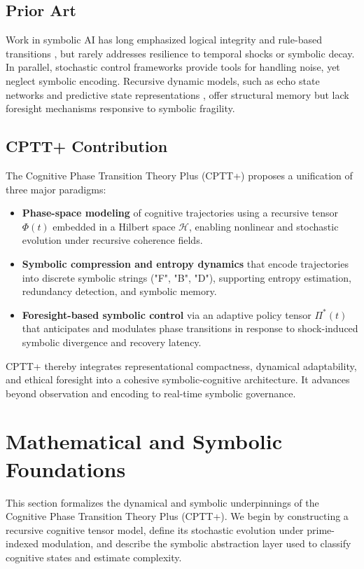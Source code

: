 \documentclass[12pt]{article}
\begin{document}
\subsection*{Prior Art}

Work in symbolic AI has long emphasized logical integrity and rule-based transitions \cite{d2020symbolic}, but rarely addresses resilience to temporal shocks or symbolic decay. In parallel, stochastic control frameworks \cite{gardiner2009stochastic} provide tools for handling noise, yet neglect symbolic encoding. Recursive dynamic models, such as echo state networks and predictive state representations \cite{jaeger2001echo}, offer structural memory but lack foresight mechanisms responsive to symbolic fragility.

\subsection*{CPTT+ Contribution}

The Cognitive Phase Transition Theory Plus (CPTT+) proposes a unification of three major paradigms:

\begin{itemize}
  \item \textbf{Phase-space modeling} of cognitive trajectories using a recursive tensor $\Phi(t)$ embedded in a Hilbert space $\mathcal{H}$, enabling nonlinear and stochastic evolution under recursive coherence fields.
  \item \textbf{Symbolic compression and entropy dynamics} that encode trajectories into discrete symbolic strings ("F", "B", "D"), supporting entropy estimation, redundancy detection, and symbolic memory.
  \item \textbf{Foresight-based symbolic control} via an adaptive policy tensor $\Pi^*(t)$ that anticipates and modulates phase transitions in response to shock-induced symbolic divergence and recovery latency.
\end{itemize}

CPTT+ thereby integrates representational compactness, dynamical adaptability, and ethical foresight into a cohesive symbolic-cognitive architecture. It advances beyond observation and encoding to real-time symbolic governance.

\section{Mathematical and Symbolic Foundations}

This section formalizes the dynamical and symbolic underpinnings of the Cognitive Phase Transition Theory Plus (CPTT+). We begin by constructing a recursive cognitive tensor model, define its stochastic evolution under prime-indexed modulation, and describe the symbolic abstraction layer used to classify cognitive states and estimate complexity.
\end{document}
